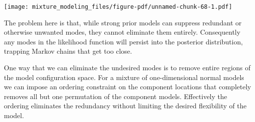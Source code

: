 \documentclass[
  letterpaper,
  DIV=11,
  numbers=noendperiod]{scrartcl}
\begin{document}
\texttt{[image: mixture\_modeling\_files/figure-pdf/unnamed-chunk-68-1.pdf]}

The problem here is that, while strong prior models can suppress
redundant or otherwise unwanted modes, they cannot eliminate them
entirely. Consequently any modes in the likelihood function will persist
into the posterior distribution, trapping Markov chains that get too
close.

One way that we can eliminate the undesired modes is to remove entire
regions of the model configuration space. For a mixture of
one-dimensional normal models we can impose an ordering constraint on
the component locations that completely removes all but one permutation
of the component models. Effectively the ordering eliminates the
redundancy without limiting the desired flexibility of the model.
\end{document}

